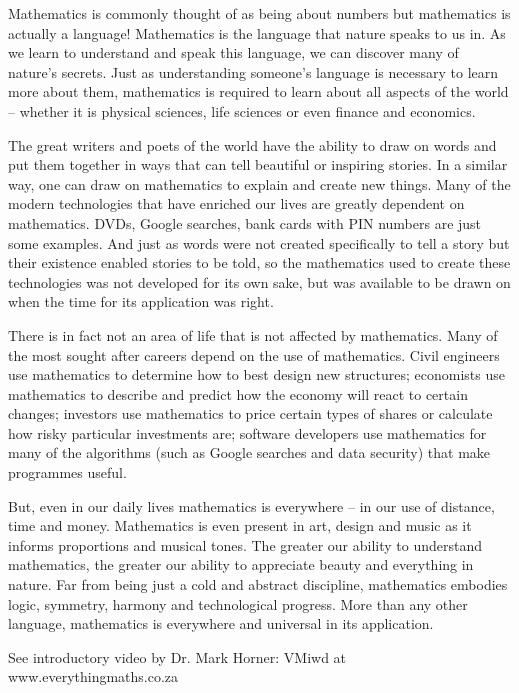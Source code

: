 { \Large
Mathematics is commonly thought of as being about numbers but mathematics is actually a language! Mathematics is the language that nature speaks to us in. As we learn to understand and speak this language, we can discover many of nature’s secrets. Just as understanding someone’s language is necessary to learn more about them, mathematics is required to learn about all aspects of the world -- whether it is physical sciences, life sciences or even finance and economics.\par


The great writers and poets of the world have the ability to draw on words and put them together in
ways that can tell beautiful or inspiring stories. In a similar way, one can draw on mathematics to
explain and create new things. Many of the modern technologies that have enriched our lives are
greatly dependent on mathematics. DVDs, Google searches, bank cards with PIN numbers are just
some examples. And just as words were not created specifically to tell a story but their existence enabled
stories to be told, so the mathematics used to create these technologies was not developed for its own sake,
but was available to be drawn on when the time for its application was right.\par


There is in fact not an area of life that is not affected by mathematics. Many of the most sought after
careers depend on the use of mathematics. Civil engineers use mathematics to determine how to best
design new structures; economists use mathematics to describe and predict how the economy will react
to certain changes; investors use mathematics to price certain types of shares or calculate how risky
particular investments are; software developers use mathematics for many of the algorithms (such as
Google searches and data security) that make programmes useful.\par



But, even in our daily lives mathematics is everywhere – in our use of distance, time and money.
Mathematics is even present in art, design and music as it informs proportions and musical tones. The
greater our ability to understand mathematics, the greater our ability to appreciate beauty and
everything in nature. Far from being just a cold and abstract discipline, mathematics
embodies logic, symmetry, harmony and technological progress. More than any other language,
mathematics is everywhere and universal in its application.\par


See introductory video by Dr. Mark Horner:  VMiwd at www.everythingmaths.co.za



}





